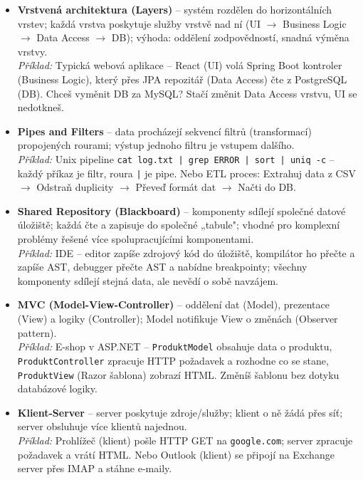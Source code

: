 \begin{itemize}
  \item \textbf{Vrstvená architektura (Layers)} -- systém rozdělen do horizontálních vrstev;
    každá vrstva poskytuje služby vrstvě nad ní (UI $\to$ Business Logic $\to$ Data Access $\to$ DB);
    výhoda: oddělení zodpovědností, snadná výměna vrstvy. \\
    \textit{Příklad:} Typická webová aplikace -- React (UI) volá Spring Boot kontroler (Business Logic),
    který přes JPA repozitář (Data Access) čte z PostgreSQL (DB). Chceš vyměnit DB za MySQL?
    Stačí změnit Data Access vrstvu, UI se nedotkneš.

  \item \textbf{Pipes and Filters} -- data procházejí sekvencí filtrů (transformací) propojených rourami;
    výstup jednoho filtru je vstupem dalšího. \\
    \textit{Příklad:} Unix pipeline \texttt{cat log.txt | grep ERROR | sort | uniq -c} --
    každý příkaz je filtr, roura \texttt{|} je pipe. Nebo ETL proces:
    Extrahuj data z CSV $\to$ Odstraň duplicity $\to$ Převeď formát dat $\to$ Načti do DB.

  \item \textbf{Shared Repository (Blackboard)} -- komponenty sdílejí společné datové úložiště;
    každá čte a zapisuje do společné „tabule"; vhodné pro komplexní problémy řešené více
    spolupracujícími komponentami. \\
    \textit{Příklad:} IDE -- editor zapíše zdrojový kód do úložiště, kompilátor ho přečte a
    zapíše AST, debugger přečte AST a nabídne breakpointy; všechny komponenty sdílejí
    stejná data, ale nevědí o sobě navzájem.

  \item \textbf{MVC (Model-View-Controller)} -- oddělení dat (Model), prezentace (View) a
    logiky (Controller); Model notifikuje View o změnách (Observer pattern). \\
    \textit{Příklad:} E-shop v ASP.NET -- \texttt{ProduktModel} obsahuje data o produktu,
    \texttt{ProduktController} zpracuje HTTP požadavek a rozhodne co se stane,
    \texttt{ProduktView} (Razor šablona) zobrazí HTML. Změníš šablonu bez dotyku databázové logiky.

  \item \textbf{Klient-Server} -- server poskytuje zdroje/služby; klient o ně žádá přes síť;
    server obsluhuje více klientů najednou. \\
    \textit{Příklad:} Prohlížeč (klient) pošle HTTP GET na \texttt{google.com};
    server zpracuje požadavek a vrátí HTML. Nebo Outlook (klient) se připojí na Exchange server
    přes IMAP a stáhne e-maily.


\end{itemize}
